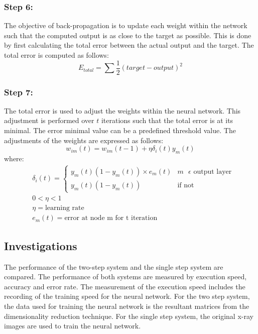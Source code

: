 \documentclass[11pt,twocolumn]{witseiepaper}
\begin{document}
	\subsubsection{Step 6:}
	The objective of back-propagation is to update each weight within the network such that the computed output is as close to the target as possible. This is done by first calculating the total error between the actual output and the target. The total error is computed as follows:
	\begin{equation}
		E_{total} = \sum \frac{1}{2} (target - output)^2
	\end{equation}
	
	\subsubsection{Step 7:}
	The total error is used to adjust the weights within the neural network. This adjustment is performed over $t$ iterations such that the total error is at its minimal. The error minimal value can be a predefined threshold value. The adjustments of the weights are expressed as follows:
	\begin{equation}
		w_{im}(t) = w_{im}(t-1)+\eta\delta_i(t)y_m(t)
	\end{equation}
	where:
	\begin{align*}
		& \delta_i(t) = 
		\begin{cases}
			y_m(t)(1 - y_m(t))\times e_m(t) & m \text{ } \epsilon \text{ output layer}\\
			y_m(t)(1 - y_m(t)) & \text{if not}
		\end{cases} \\
		& 0 < \eta < 1 \\
		& \eta = \text{learning rate} \\
		& e_m(t) = \text{error at node m for t iteration}
	\end{align*}
	
	\subsection{Investigations}
	The performance of the two-step system and the single step system are compared. The performance of both systems are measured by execution speed, accuracy and error rate. The measurement of the execution speed includes the recording of the training speed for the neural network. For the two step system, the data used for training the neural network is the resultant matrices from the dimensionality reduction technique. For the single step system, the original x-ray images are used to train the neural network. 
	
\end{document}
